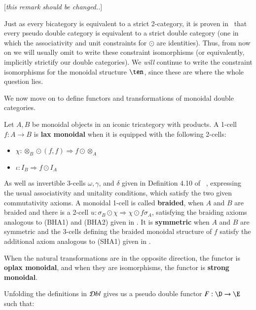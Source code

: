 \documentclass{amsart}
\begin{document}
[{\it this remark should be changed..}]

Just as every bicategory is equivalent to a strict 2-category, it is
proven in~\cite{gp:double-limits} that every pseudo double category is
equivalent to a strict double category (one in which the associativity
and unit constraints for $\odot$ are identities).  Thus, from now on
we will usually omit to write these constraint isomorphisms (or
equivalently, implicitly strictify our double categories).  We
\emph{will} continue to write the constraint isomorphisms for the
monoidal structure $\ten$, since these are where the whole question
lies.

We now move on to define functors and transformations of monoidal double categories.

\begin{defn}
Let $A,B$ be monoidal objects in an iconic tricategory  with products. A 1-cell $f:A \rightarrow B$ is {\bf lax monoidal} when it is equipped with the following 2-cells:
\begin{itemize}
\item $\chi: \otimes_B \odot (f,f) \Rightarrow f \odot \otimes_A$
\item $\iota: I_B \Rightarrow f \odot I_A$
\end{itemize}
As well as invertible 3-cells $\omega, \gamma$, and $\delta$ given in Definition 4.10 of ~\cite{nick:tricatsbook}, expressing the usual associativity and unitality conditions, which satisfy the two given commutativity axioms.
A monoidal 1-cell is called {\bf braided}, when $A$ and $B$ are braided and there is a 2-cell $u: \sigma_B \odot \chi  \Rightarrow \chi \odot f\sigma_A$, satisfying the braiding axioms analogous to (BHA1) and (BHA2) given in  \cite[p141-142]{mccrudden:bal-coalgb}. It is {\bf symmetric} when $A$ and $B$ are symmetric and the 3-cells defining the braided monoidal structure of $f$ satisfy the additional axiom analogous to  (SHA1) given in   \cite[p145]{mccrudden:bal-coalgb}.

When the natural transformations are in the opposite direction, the functor is {\bf oplax monoidal}, and when they are isomorphisms, the functor is {\bf strong monoidal}.
\end{defn}


Unfolding the definitions in $\mathcal{D} bl$ gives us a pseudo double functor $F: \D \rightarrow \E$ such that:
\end{document}
